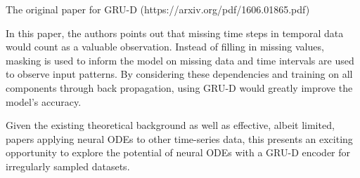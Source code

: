 \documentclass{article} %
\begin{document}
The original paper for GRU-D (https://arxiv.org/pdf/1606.01865.pdf)

In this paper, the authors points out that missing time steps in temporal data would count as a valuable observation. Instead of filling in missing values, masking is used to inform the model on missing data and time intervals are used to observe input patterns. By considering these dependencies and training on all components through back propagation, using GRU-D would greatly improve the model's accuracy.

Given the existing theoretical background as well as effective, albeit limited, papers applying neural ODEs to other time-series data, this presents an exciting opportunity to explore the potential of neural ODEs with a GRU-D encoder for irregularly sampled datasets.
\end{document}
